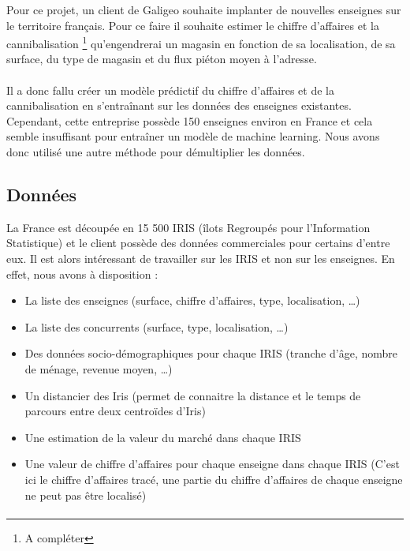 Pour ce projet, un client de Galigeo souhaite implanter de nouvelles enseignes sur le territoire français. Pour ce faire il souhaite estimer le chiffre d’affaires et la cannibalisation \footnote {A compléter} qu’engendrerai un magasin en fonction de sa localisation, de sa surface, du type de magasin et du flux piéton moyen à l’adresse. 

\paragraph{}

Il a donc fallu créer un modèle prédictif du chiffre d’affaires et de la cannibalisation en s’entraînant sur les données des enseignes existantes. Cependant, cette entreprise possède 150 enseignes environ en France et cela semble insuffisant pour entraîner un modèle de machine learning. Nous avons donc utilisé une autre méthode pour démultiplier les données.


\subsection{Données}

La France est découpée en 15 500 IRIS (îlots Regroupés pour l'Information Statistique) et le client possède des données commerciales pour certains d’entre eux. Il est alors intéressant de travailler sur les IRIS et non sur les enseignes. En effet, nous avons à disposition :

\begin{itemize}
    \item La liste des enseignes (surface, chiffre d’affaires, type, localisation, …)
    \item La liste des concurrents (surface, type, localisation, …)
    \item Des données socio-démographiques pour chaque IRIS (tranche d’âge, nombre de ménage, revenue moyen, …)
    \item Un distancier des Iris (permet de connaitre la distance et le temps de parcours entre deux centroïdes d’Iris)
    \item Une estimation de la valeur du marché dans chaque IRIS
    \item Une valeur de chiffre d’affaires pour chaque enseigne dans chaque IRIS (C’est ici le chiffre d’affaires tracé, une partie du chiffre d’affaires de chaque enseigne ne peut pas être localisé)
\end{itemize}

\paragraph{}

